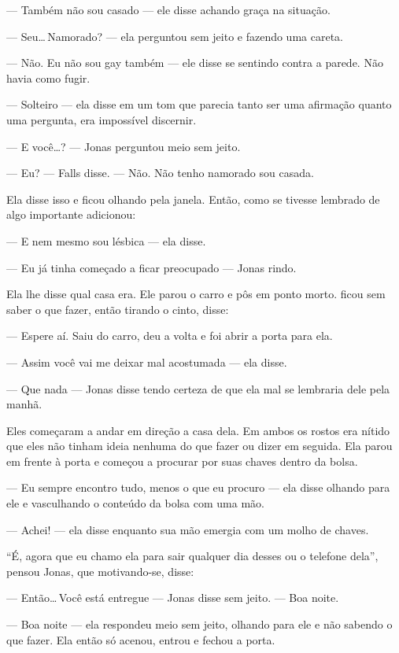 --- Também não sou casado --- ele disse\mudanca{,} achando graça na situação.

--- Seu\ldots\,Namorado? --- ela perguntou sem jeito\mudanca{,} e fazendo uma careta.

--- Não. Eu não sou gay também --- ele disse se sentindo contra a parede. Não havia como fugir.

--- Solteiro --- ela disse em um tom que parecia tanto ser uma afirmação quanto uma pergunta, era impossível discernir.

--- E você\ldots? --- Jonas perguntou\mudanca{,} meio sem jeito. %

--- Eu? --- Falls disse. --- Não. Não tenho namorado sou casada.

Ela disse isso e ficou olhando pela janela. Então, como se tivesse lembrado de algo importante adicionou:

--- E nem mesmo sou lésbica --- ela disse.

--- Eu já tinha começado a ficar preocupado --- Jonas rindo.

Ela lhe disse qual casa era. Ele parou o carro e pôs em ponto morto.  ficou sem saber o que fazer, então\mudanca{,} tirando o cinto, disse:

--- Espere aí. Saiu do carro, deu a volta e foi abrir a porta para ela.

--- Assim você vai me deixar mal acostumada --- ela disse.

--- Que nada --- Jonas disse\mudanca{,} tendo certeza de que ela mal se lembraria dele pela manhã.

Eles começaram a andar em direção a casa dela. Em ambos os rostos era nítido que eles não tinham ideia nenhuma do que fazer ou dizer em seguida. Ela parou em frente à porta e começou a procurar por suas chaves dentro da bolsa.

--- Eu sempre encontro tudo, menos o que eu procuro --- ela disse\mudanca{,} olhando para ele e vasculhando o conteúdo da bolsa com uma mão.

--- Achei! --- ela disse\mudanca{,} enquanto sua mão emergia com um molho de chaves.

``É, agora que eu chamo ela para sair qualquer dia desses ou o telefone dela'', pensou Jonas, que motivando-se, disse:

--- Então\ldots\,Você está entregue --- Jonas disse sem jeito. --- Boa noite.

--- Boa noite --- ela respondeu meio sem jeito, olhando para ele e não sabendo o que fazer. Ela então só acenou, entrou e fechou a porta.

